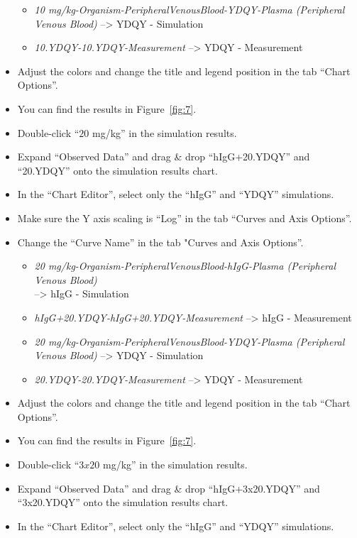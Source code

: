 \documentclass[fleqn,10pt]{physiome}
\begin{document}
\begin{itemize}
\begin{itemize}
        \item \textit{10 mg/kg-Organism-PeripheralVenousBlood-YDQY-Plasma (Peripheral Venous Blood)} --> YDQY - Simulation
        \item \textit{10.YDQY-10.YDQY-Measurement} --> YDQY - Measurement
    \end{itemize}
    \item Adjust the colors and change the title and legend position in the tab ``Chart Options''.
    \item You can find the results in Figure~\ref{fig:7}.
    \item Double-click ``$20$ mg/kg'' in the simulation results.
    \item Expand ``Observed Data'' and drag \& drop ``hIgG+20.YDQY'' and ``20.YDQY'' onto the simulation results chart.
    \item In the ``Chart Editor'', select only the ``hIgG'' and ``YDQY'' simulations.
    \item Make sure the Y axis scaling is ``Log'' in the tab ``Curves and Axis Options''.
    \item Change the ``Curve Name'' in the tab "Curves and Axis Options''.
    \begin{itemize}
        \item \textit{20 mg/kg-Organism-PeripheralVenousBlood-hIgG-Plasma (Peripheral Venous Blood)} 
        \\--> hIgG -  Simulation
        \item \textit{hIgG+20.YDQY-hIgG+20.YDQY-Measurement} --> hIgG - Measurement
        \item \textit{20 mg/kg-Organism-PeripheralVenousBlood-YDQY-Plasma (Peripheral Venous Blood)} --> YDQY - Simulation
        \item \textit{20.YDQY-20.YDQY-Measurement} --> YDQY - Measurement
    \end{itemize}
    \item Adjust the colors and change the title and legend position in the tab ``Chart Options''.
    \item You can find the results in Figure~\ref{fig:7}.
    \item Double-click ``$3x20$ mg/kg'' in the simulation results.
    \item Expand ``Observed Data'' and drag \& drop ``hIgG+3x20.YDQY'' and ``3x20.YDQY'' onto the simulation results chart.
    \item In the ``Chart Editor'', select only the ``hIgG'' and ``YDQY'' simulations.

\end{itemize}
\end{document}
